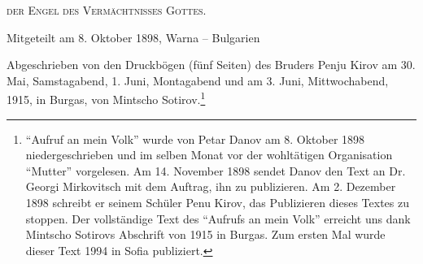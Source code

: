 \textsc{der Engel des Vermächtnisses Gottes.}
\vspace{0.5em}

Mitgeteilt am 8. Oktober 1898, Warna -- Bulgarien 

\vspace{0.5em}
Abgeschrieben von den Druckbögen (fünf Seiten) des Bruders Penju Kirov am 30. Mai, Samstagabend, 1. Juni, Montagabend und am 3. Juni, Mittwochabend, 1915, in Burgas, von Mintscho Sotirov.\footnote{ "`Aufruf an mein Volk"' wurde von Petar Danov am 8. Oktober 1898 niedergeschrieben und im selben Monat vor der wohltätigen Organisation "`Mutter"' vorgelesen. Am 14. November 1898 sendet Danov den Text an Dr. Georgi Mirkovitsch mit dem Auftrag, ihn zu publizieren. Am 2. Dezember 1898 schreibt er seinem Schüler Penu Kirov, das Publizieren dieses Textes zu stoppen. Der vollständige Text des "`Aufrufs an mein Volk"' erreicht uns dank Mintscho Sotirovs Abschrift von 1915 in Burgas. Zum ersten Mal wurde dieser Text 1994 in Sofia publiziert. }

